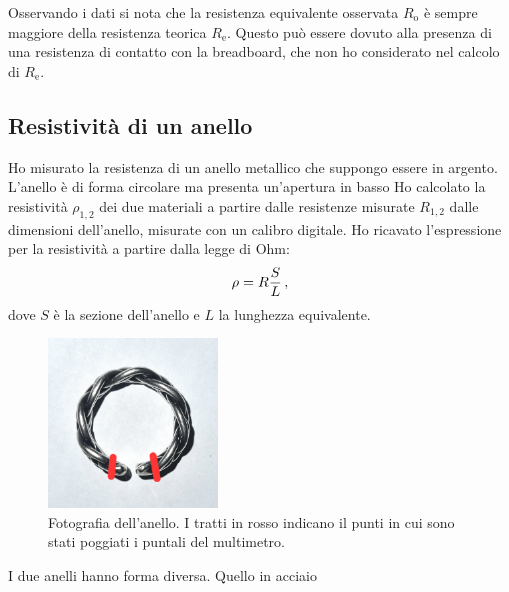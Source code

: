                 Osservando i dati si nota che la resistenza equivalente osservata $R_\text{o}$ è sempre maggiore della resistenza teorica $R_\text{e}$. Questo può essere dovuto alla presenza di una resistenza di contatto con la breadboard, che non ho considerato nel calcolo di $R_\text{e}$.

            \subsection{Resistività di un anello}
                Ho misurato la resistenza di un anello metallico che suppongo essere in argento. L'anello è di forma circolare ma presenta un'apertura in basso
                Ho calcolato la resistività $\rho_{1,2}$ dei due materiali a partire dalle resistenze misurate $R_{1,2}$ dalle dimensioni dell'anello, misurate con un calibro digitale. Ho ricavato l'espressione per la resistività a partire dalla legge di Ohm:
                \begin{equation*}
                    \rho = R\frac{S}{L}
                    \,,
                \end{equation*}
                dove $S$ è la sezione dell'anello e $L$ la lunghezza equivalente.
                \begin{figure}
                    \centering
                    \includegraphics[width=0.4\textwidth]{images/multimetro/anello.jpg}
                    \caption{Fotografia dell'anello. I tratti in rosso indicano il punti in cui sono stati poggiati i puntali del multimetro.}
                    \label{fig:mul:anello}
                \end{figure}

                I due anelli hanno forma diversa. Quello in acciaio

